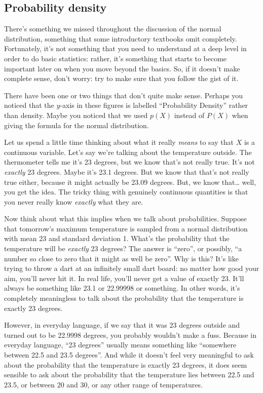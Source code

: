 \documentclass[
]{book}
\theoremstyle{definition}
\theoremstyle{definition}
\theoremstyle{definition}
\theoremstyle{definition}
\theoremstyle{remark}
\begin{document}
\hypertarget{density}{%
\subsection{Probability density}\label{density}}

There's something we missed throughout the discussion of the normal distribution, something that some introductory textbooks omit completely. Fortunately, it's not something that you need to understand at a deep level in order to do basic statistics: rather, it's something that starts to become important later on when you move beyond the basics. So, if it doesn't make complete sense, don't worry: try to make sure that you follow the gist of it.

There have been one or two things that don't quite make sense. Perhaps you noticed that the \(y\)-axis in these figures is labelled ``Probability Density'' rather than density. Maybe you noticed that we used \(p(X)\) instead of \(P(X)\) when giving the formula for the normal distribution.

Let us spend a little time thinking about what it really \emph{means} to say that \(X\) is a continuous variable. Let's say we're talking about the temperature outside. The thermometer tells me it's 23 degrees, but we know that's not really true. It's not \emph{exactly} 23 degrees. Maybe it's 23.1 degrees. But we know that that's not really true either, because it might actually be 23.09 degrees. But, we know that\ldots{} well, you get the idea. The tricky thing with genuinely continuous quantities is that you never really know \emph{exactly} what they are.

Now think about what this implies when we talk about probabilities. Suppose that tomorrow's maximum temperature is sampled from a normal distribution with mean 23 and standard deviation 1. What's the probability that the temperature will be \emph{exactly} 23 degrees? The answer is ``zero'', or possibly, ``a number so close to zero that it might as well be zero''. Why is this? It's like trying to throw a dart at an infinitely small dart board: no matter how good your aim, you'll never hit it. In real life, you'll never get a value of exactly 23. It'll always be something like 23.1 or 22.99998 or something. In other words, it's completely meaningless to talk about the probability that the temperature is exactly 23 degrees.

However, in everyday language, if we say that it was 23 degrees outside and turned out to be 22.9998 degrees, you probably wouldn't make a fuss. Because in everyday language, ``23 degrees'' usually means something like ``somewhere between 22.5 and 23.5 degrees''. And while it doesn't feel very meaningful to ask about the probability that the temperature is exactly 23 degrees, it does seem sensible to ask about the probability that the temperature lies between 22.5 and 23.5, or between 20 and 30, or any other range of temperatures.
\end{document}
